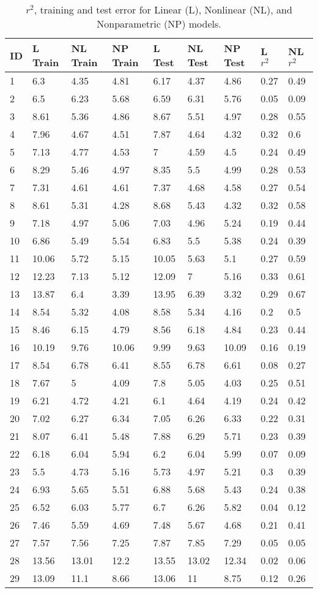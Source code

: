 \documentclass[12pt]{article}
\begin{document}
\begin{table}
\begin{tabular}{|l|l|l|l|l|l|l|l|l|}
\hline
ID & L Train & NL Train & NP Train & L Test & NL Test & NP Test & L $r^2$ & NL $r^2$\\\hline
1&6.3&4.35&4.81&6.17&4.37&4.86&0.27&0.49\\\hline
2&6.5&6.23&5.68&6.59&6.31&5.76&0.05&0.09\\\hline
3&8.61&5.36&4.86&8.67&5.51&4.97&0.28&0.55\\\hline
4&7.96&4.67&4.51&7.87&4.64&4.32&0.32&0.6\\\hline
5&7.13&4.77&4.53&7&4.59&4.5&0.24&0.49\\\hline
6&8.29&5.46&4.97&8.35&5.5&4.99&0.28&0.53\\\hline
7&7.31&4.61&4.61&7.37&4.68&4.58&0.27&0.54\\\hline
8&8.61&5.31&4.28&8.68&5.43&4.32&0.32&0.58\\\hline
9&7.18&4.97&5.06&7.03&4.96&5.24&0.19&0.44\\\hline
10&6.86&5.49&5.54&6.83&5.5&5.38&0.24&0.39\\\hline
11&10.06&5.72&5.15&10.05&5.63&5.1&0.27&0.59\\\hline
12&12.23&7.13&5.12&12.09&7&5.16&0.33&0.61\\\hline
13&13.87&6.4&3.39&13.95&6.39&3.32&0.29&0.67\\\hline
14&8.54&5.32&4.08&8.58&5.34&4.16&0.2&0.5\\\hline
15&8.46&6.15&4.79&8.56&6.18&4.84&0.23&0.44\\\hline
16&10.19&9.76&10.06&9.99&9.63&10.09&0.16&0.19\\\hline
17&8.54&6.78&6.41&8.55&6.78&6.61&0.08&0.27\\\hline
18&7.67&5&4.09&7.8&5.05&4.03&0.25&0.51\\\hline
19&6.21&4.72&4.21&6.1&4.64&4.19&0.24&0.42\\\hline
20&7.02&6.27&6.34&7.05&6.26&6.33&0.22&0.31\\\hline
21&8.07&6.41&5.48&7.88&6.29&5.71&0.23&0.39\\\hline
22&6.18&6.04&5.94&6.2&6.04&5.99&0.07&0.09\\\hline
23&5.5&4.73&5.16&5.73&4.97&5.21&0.3&0.39\\\hline
24&6.93&5.65&5.51&6.88&5.68&5.43&0.24&0.38\\\hline
25&6.52&6.03&5.77&6.7&6.26&5.82&0.04&0.12\\\hline
26&7.46&5.59&4.69&7.48&5.67&4.68&0.21&0.41\\\hline
27&7.57&7.56&7.25&7.87&7.85&7.29&0.05&0.05\\\hline
28&13.56&13.01&12.2&13.55&13.02&12.34&0.02&0.06\\\hline
29&13.09&11.1&8.66&13.06&11&8.75&0.12&0.26\\\hline
\end{tabular}
\caption{$r^2$, training and test error for Linear (L), Nonlinear (NL), and Nonparametric (NP) models.}
\label{resultstable}
\end{table}
\end{document}
